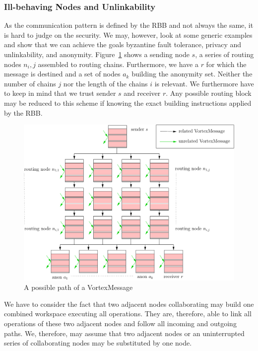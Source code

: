 \documentclass[10pt,journal,compsoc,twocolumn,twoside]{IEEEtran}
\let\MYoriglatexcaption\caption
\renewcommand{\caption}[2][\relax]{\MYoriglatexcaption[#2]{#2}}
\begin{document}
\subsubsection{Ill-behaving Nodes and Unlinkability}
As the communication pattern is defined by the RBB and not always the same, it is hard to judge on the security. We may, however, look at some generic examples and show that we can achieve the goals byzantine fault tolerance, privacy and unlinkability, and anonymity. Figure~\ref{fig:messagePaths} shows a sending node $s$, a series of routing nodes $n_i,j$ assembled to routing chains. Furthermore, we have a $r$ for which the message is destined and a set of nodes $a_k$ building the anonymity set. Neither the number of chains $j$ nor the length of the chains $i$ is relevant. We furthermore have to keep in mind that we trust sender $s$ and receiver $r$. Any possible routing block may be reduced to this scheme if knowing the exact building instructions applied by the RBB.
\begin{figure}[ht]
	\centering\includegraphics[width=0.5\columnwidth]{messagePaths}
	\caption{A possible path of a VortexMessage}
	\label{fig:messagePaths}
\end{figure}

We have to consider the fact that two adjacent nodes collaborating may build one combined workspace executing all operations. They are, therefore, able to link all operations of these two adjacent nodes and follow all incoming and outgoing paths. We, therefore, may assume that two adjacent nodes or an uninterrupted series of collaborating nodes may be substituted by one node.
\end{document}
